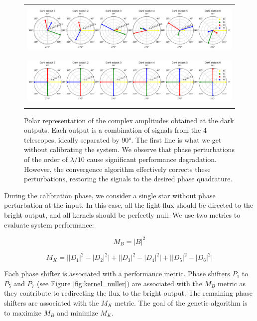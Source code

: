 \documentclass[]{spie}  %
\begin{document}
\begin{figure} [H]
    \begin{center}
    \begin{tabular}{c}
    \includegraphics[height=2.5cm]{img/perturbed_phase.png}\\
    \includegraphics[height=2.5cm]{img/calibrated_phase.png}
    \end{tabular}
    \end{center}
    \caption[phases] 
    { \label{fig:phases} 
    Polar representation of the complex amplitudes obtained at the dark outputs. Each output is a combination of signals from the 4 telescopes, ideally separated by 90°. The first line is what we get without calibrating the system. We observe that phase perturbations of the order of $\lambda / 10$ cause significant performance degradation. However, the convergence algorithm effectively corrects these perturbations, restoring the signals to the desired phase quadrature.}
\end{figure}

During the calibration phase, we consider a single star without phase perturbation at the input. In this case, all the light flux should be directed to the bright output, and all kernels should be perfectly null. We use two metrics to evaluate system performance:

\begin{equation}
    M_B = |B|^2
\end{equation}

\begin{equation}
    M_K = \Big||D_1|^2 - |D_2|^2\Big|+\Big||D_3|^2 - |D_4|^2\Big|+\Big||D_5|^2 - |D_6|^2\Big|
\end{equation}

Each phase shifter is associated with a performance metric. Phase shifters $P_1$ to $P_5$ and $P_7$ (see Figure \ref{fig:kernel_nuller}) are associated with the $M_B$ metric as they contribute to redirecting the flux to the bright output. The remaining phase shifters are associated with the $M_K$ metric. The goal of the genetic algorithm is to maximize $M_B$ and minimize $M_K$.
\end{document}
